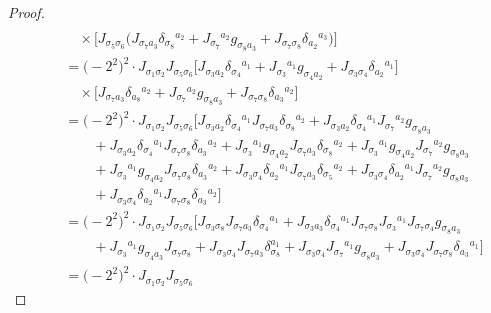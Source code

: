 \documentclass[10pt,a4paper]{amsart}
\numberwithin{equation}{section}
\theoremstyle{definition}
\begin{document}
\begin{proof}
\begin{gather}
 \nonumber\\
 \qquad\quad{} \times
\bigl[J_{\sigma_5 \sigma_6} \bigl(J_{\sigma_7 a_3} \delta_{\sigma_8}{}^{a_2}
+ J_{\sigma_7}{}^{a_2} g_{\sigma_8 a_3}
+ J_{\sigma_7 \sigma_8} \delta_{a_2}{}^{a_3} \bigr)\bigr]
 \nonumber\\
\qquad{}=
\bigl(-2^2\bigr)^2\cdot J_{\sigma_1 \sigma_2} J_{\sigma_5 \sigma_6}
\bigl[J_{\sigma_3 a_2} \delta_{\sigma_4}{}^{a_1}
+J_{\sigma_3}{}^{a_1} g_{\sigma_4 a_2}
+J_{\sigma_3 \sigma_4} \delta_{a_2}{}^{a_1} \bigr]\nonumber\\
\quad\qquad{} \times
\bigl[J_{\sigma_7 a_3} \delta_{a_8}{}^{a_2}
+J_{\sigma_7}{}^{a_2} g_{\sigma_8 a_3}
+J_{\sigma_7 \sigma_8} \delta_{a_3}{}^{a_2} \bigr]
 \nonumber\\
\qquad{}=
\bigl(-2^2\bigr)^2\cdot
J_{\sigma_1 \sigma_2} J_{\sigma_5 \sigma_6}
\bigl[ J_{\sigma_3 a_2} \delta_{\sigma_4}{}^{a_1} J_{\sigma_7 a_3}
\delta_{\sigma_8}{}^{a_2}
+J_{\sigma_3 a_2}\delta_{\sigma_4}{}^{a_1} J_{\sigma_7}{}^{a_2}
g_{\sigma_8 a_3} \nonumber
\\
\qquad\qquad{} +J_{\sigma_3 a_2} \delta_{\sigma_4}{}^{a_1} J_{\sigma_7 \sigma_8}
\delta_{a_3}{}^{a_2}
+J_{\sigma_3}{}^{a_1} g_{\sigma_4 a_2} J_{\sigma_7 a_3}
\delta_{\sigma_8}{}^{a_2}
+J_{\sigma_3}{}^{a_1} g_{\sigma_4 a_2} J_{\sigma_7}{}^{a_2}
g_{\sigma_8 a_3} \nonumber \\
 \qquad\qquad{} +J_{\sigma_3}{}^{a_1} g_{\sigma_4 a_2} J_{\sigma_7 \sigma_8}
\delta_{a_3}{}^{a_2}
+J_{\sigma_3 \sigma_4} \delta_{a_2}{}^{a_1} J_{\sigma_7 a_3}
\delta_{\sigma_5}{}^{a_2}
+J_{\sigma_3 \sigma_4} \delta_{a_2}{}^{a_1} J_{\sigma_7}{}^{a_2}
g_{\sigma_8 a_3} \nonumber\\
\qquad\qquad{} +J_{\sigma_3 \sigma_4} \delta_{a_2}{}^{a_1} J_{\sigma_7 \sigma_8}
\delta_{a_3}{}^{a_2} \bigr]\nonumber\\
\qquad{} =
\bigl(-2^2\bigr)^2\cdot J_{\sigma_1 \sigma_2} J_{\sigma_5 \sigma_6}
\bigl[J_{\sigma_3 \sigma_8} J_{\sigma_7 a_3} \delta_{\sigma_4}{}^{a_1}
+J_{\sigma_3 a_3} \delta_{\sigma_4}{}^{a_1} J_{\sigma_7 \sigma_8}
J_{\sigma_3}{}^{a_1} J_{\sigma_7 \sigma_4} g_{\sigma_8 a_3}
 \nonumber\\
 \qquad\qquad{} +J_{\sigma_3}{}^{a_1} g_{\sigma_4 a_3} J_{\sigma_7 \sigma_8}
+J_{\sigma_3 \sigma_4} J_{\sigma_7 a_3} \delta_{\sigma_8}^{a_1}
+J_{\sigma_3 \sigma_4} J_{\sigma_7}{}^{a_1} g_{\sigma_8 a_3}
+J_{\sigma_3 \sigma_4} J_{\sigma_7 \sigma_8} \delta_{a_3}{}^{a_1}\bigr]
 \nonumber\\
\qquad{} =
\bigl(-2^2\bigr)^2\cdot J_{\sigma_1 \sigma_2} J_{\sigma_5 \sigma_6}

\end{gather}
\end{proof}
\end{document}
